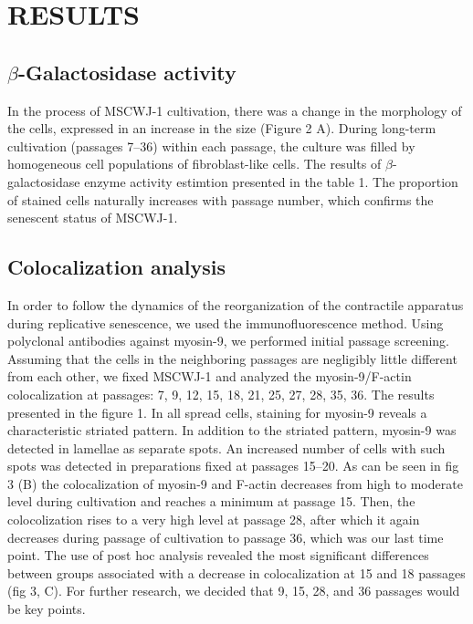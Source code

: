 \documentclass[alpha-refs]{wiley-article}
\begin{document}
\section{RESULTS}

\subsection{$\beta$-Galactosidase activity}

In the process of MSCWJ-1 cultivation, there was a change in the morphology of the cells, expressed in an increase in the size (Figure 2 A).
During long-term cultivation (passages 7--36) within each passage, the culture was filled by homogeneous cell populations of fibroblast-like cells.
The results of $\beta$-galactosidase enzyme activity estimtion presented in the table 1.
The proportion of stained cells naturally increases with passage number, which confirms the senescent status of MSCWJ-1.

\subsection{Colocalization analysis}

In order to follow the dynamics of the reorganization of the contractile apparatus during replicative senescence, we used the immunofluorescence method.
Using polyclonal antibodies against myosin-9, we performed initial passage screening.
Assuming that the cells in the neighboring passages are negligibly little different from each other, we fixed MSCWJ-1 and analyzed the myosin-9/F-actin colocalization at passages: 7, 9, 12, 15, 18, 21, 25, 27, 28, 35, 36.
The results presented in the figure 1.
In all spread cells, staining for myosin-9 reveals a characteristic striated pattern.
In addition to the striated pattern, myosin-9 was detected in lamellae as separate spots.
An increased number of cells with such spots was detected in preparations fixed at passages 15--20.
As can be seen in fig 3 (B) the colocalization of myosin-9 and F-actin decreases from high to moderate level during cultivation and reaches a minimum at passage 15.
Then, the colocolization rises to a very high level at passage 28, after which it again decreases during passage of cultivation to passage 36, which was our last time point.
The use of post hoc analysis revealed the most significant differences between groups associated with a decrease in colocalization at 15 and 18 passages (fig 3, C).
For further research, we decided that 9, 15, 28, and 36 passages would be key points.
\end{document}
